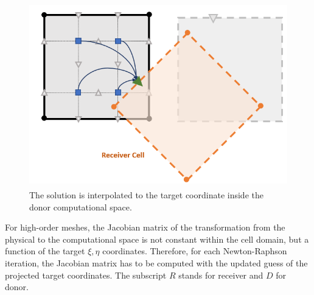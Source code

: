%
\begin{figure}[H]
	\centering
	\includegraphics[height=8.0cm]{figs/overset/space_transformation_p2.png}
    \caption{The solution is interpolated to the target coordinate inside the donor computational space.}
    \label{fig:space_transform_p2}
\end{figure}
%
%
For high-order meshes, the Jacobian matrix of the transformation from the physical to the computational space is not constant within the cell domain, but a function of the target $\xi, \eta$ coordinates. Therefore, for each Newton-Raphson iteration, the Jacobian matrix has to be computed with the updated guess of the projected target coordinates. The subscript $R$ stands for receiver and $D$ for donor.
